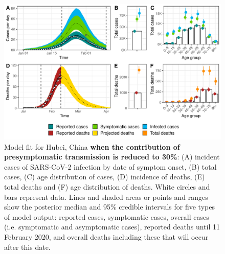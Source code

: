 \documentclass{article}
\begin{document}
\begin{figure}[H]
	\includegraphics[width=\linewidth]{../format_output/figures_v3/supp_fit_16G.pdf}
	\caption{Model fit for Hubei, China \textbf{when the contribution of presymptomatic transmission is reduced to 30\%}: (A) incident cases of SARS-CoV-2 infection by date of symptom onset, (B) total cases, (C) age distribution of cases, (D) incidence of deaths, (E) total deaths and (F) age distribution of deaths. White circles and bars represent data. Lines and shaded areas or points and ranges show the posterior median and 95\% credible intervals for five types of model output: reported cases, symptomatic cases, overall cases (i.e. symptomatic and asymptomatic cases), reported deaths until 11 February 2020, and overall deaths including these that will occur after this date.}\label{fig:sens_q30}
\end{figure}
\end{document}
